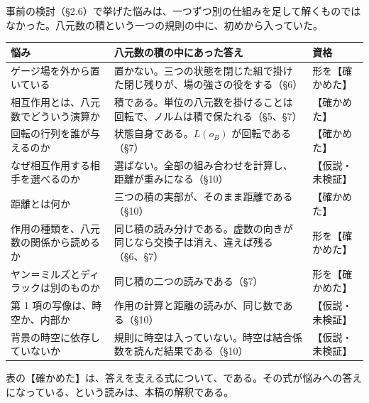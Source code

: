\documentclass[
  a4paper,
]{ltjsarticle}
\newcounter{none} %
\begin{document}
事前の検討（§2.6）で挙げた悩みは、一つずつ別の仕組みを足して解くものではなかった。八元数の積という一つの規則の中に、初めから入っていた。

{\def\LTcaptype{none} %
\begin{longtable}[]{@{}
  >{\raggedright\arraybackslash}p{}
  >{\raggedright\arraybackslash}p{}
  >{\raggedright\arraybackslash}p{}@{}}
\toprule\noalign{}
\begin{minipage}[b]{\linewidth}\raggedright
悩み
\end{minipage} & \begin{minipage}[b]{\linewidth}\raggedright
八元数の積の中にあった答え
\end{minipage} & \begin{minipage}[b]{\linewidth}\raggedright
資格
\end{minipage} \\
\midrule\noalign{}
\endhead
\bottomrule\noalign{}
\endlastfoot
ゲージ場を外から置いている &
置かない。三つの状態を閉じた組で掛けた閉じ残りが、場の強さの役をする（§6）
& 形を【確かめた】 \\
相互作用とは、八元数でどういう演算か &
積である。単位の八元数を掛けることは回転で、ノルムは積で保たれる（§5、§7）
& 【確かめた】 \\
回転の行列を誰が与えるのか & 状態自身である。\(L(o_B)\)
が回転である（§7） & 【確かめた】 \\
なぜ相互作用する相手を選べるのか &
選ばない。全部の組み合わせを計算し、距離が重みになる（§10） &
【仮説・未検証】 \\
距離とは何か & 三つの積の実部が、そのまま距離である（§10） &
【確かめた】 \\
作用の種類を、八元数の関係から読めるか &
同じ積の読み分けである。虚数の向きが同じなら交換子は消え、違えば残る（§6、§7）
& 形を【確かめた】 \\
ヤン＝ミルズとディラックは別のものか & 同じ積の二つの読みである（§7） &
形を【確かめた】 \\
第 1 項の写像は、時空か、内部か &
作用の計算と距離の読みが、同じ数である（§10） & 【仮説・未検証】 \\
背景の時空に依存していないか &
規則に時空は入っていない。時空は結合係数を読んだ結果である（§10） &
【仮説・未検証】 \\
\end{longtable}
}

表の【確かめた】は、答えを支える式について、である。その式が悩みへの答えになっている、という読みは、本稿の解釈である。
\end{document}
